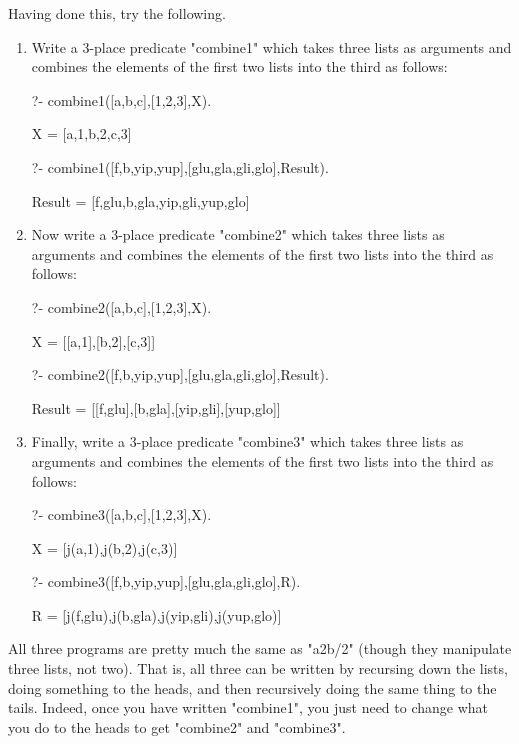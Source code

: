 Having done this, try the following.

\begin{enumerate}
\item{}Write a 3-place predicate "combine1" which takes three
lists as arguments and combines the elements of the first two lists
into the third as follows:
\begin{LPNcodedisplay}
?- combine1([a,b,c],[1,2,3],X).

X = [a,1,b,2,c,3]

?- combine1([f,b,yip,yup],[glu,gla,gli,glo],Result).

Result = [f,glu,b,gla,yip,gli,yup,glo]
\end{LPNcodedisplay}

\item{}Now write a 3-place predicate "combine2" which takes three
lists as arguments and combines the elements of the first two lists
into the third as follows:
\begin{LPNcodedisplay}
?- combine2([a,b,c],[1,2,3],X).

X = [[a,1],[b,2],[c,3]]

?- combine2([f,b,yip,yup],[glu,gla,gli,glo],Result).

Result = [[f,glu],[b,gla],[yip,gli],[yup,glo]]
\end{LPNcodedisplay}

\item{}Finally, write a 3-place predicate "combine3" which takes
three lists as arguments and combines the elements of the first two lists
into the third as follows:
\begin{LPNcodedisplay}
?- combine3([a,b,c],[1,2,3],X).

X = [j(a,1),j(b,2),j(c,3)]

?- combine3([f,b,yip,yup],[glu,gla,gli,glo],R).

R = [j(f,glu),j(b,gla),j(yip,gli),j(yup,glo)]
\end{LPNcodedisplay}

\end{enumerate}

All three programs are pretty much the same as "a2b/2" (though they
manipulate three lists, not two).  That is, all three can be written
by recursing down the lists, doing something to the heads, and then
recursively doing the same thing to the tails.  Indeed, once you have
written "combine1", you just need to change what you do to the heads
to get "combine2" and "combine3".

